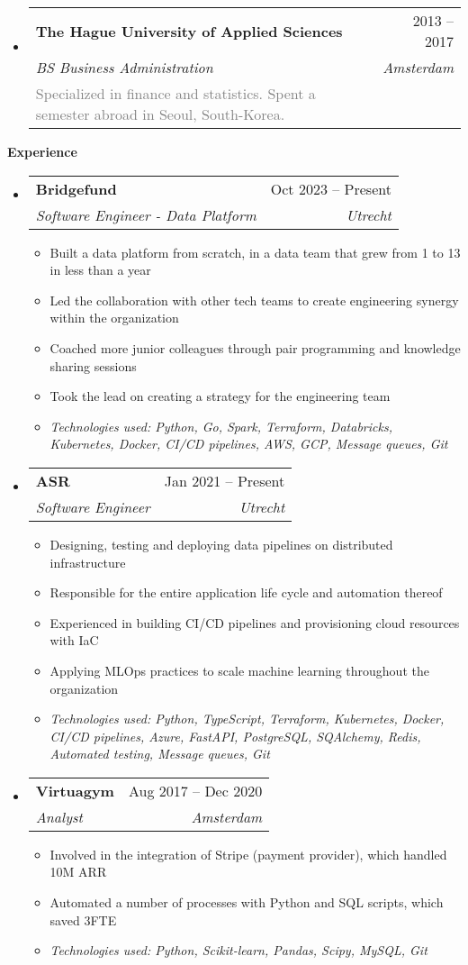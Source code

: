 \documentclass[letterpaper,12pt]{article}[leftmargin=*]
\makeatletter
\def \entryspacing {-0pt}
\renewcommand{\section}[2]{\vspace{5pt}
  \colorbox{secondary}{\color{white}\raggedbottom\normalsize\textbf{{#1}{\hspace{7pt}#2}}}
}
\newcommand{\resumeEntryStart}{\begin{itemize}[leftmargin=2.5mm]}
\newcommand{\resumeEntryEnd}{\end{itemize}\vspace{\entryspacing}}
\newcommand{\resumeItemListStart}{\begin{itemize}[leftmargin=4.5mm]}
\newcommand{\resumeItemListEnd}{\end{itemize}}
\newcommand{\resumeItem}[1]{
  \item\small{
    {#1 \vspace{-2pt}}
  }
}
\newcommand{\resumeEntryExtraText}[5]{
  \vspace{-1pt}\item[]
    \begin{tabularx}{0.97\textwidth}{X@{\hspace{60pt}}r}
      \textbf{\color{primary}#1} & {\firabook\color{accent}\small#2} \\
      \textit{\color{accent}\small#3} & \textit{\color{accent}\small#4} \\
      \textcolor{gray}{\small#5} & %
    \end{tabularx}\vspace{-6pt}
}
\newcommand{\resumeEntryTSDL}[4]{
  \vspace{-1pt}\item[]
    \begin{tabularx}{0.97\textwidth}{X@{\hspace{60pt}}r}
      \textbf{\color{primary}#1} & {\firabook\color{accent}\small#2} \\
      \textit{\color{accent}\small#3} & \textit{\color{accent}\small#4} \\
    \end{tabularx}\vspace{-6pt}
}
\makeatother
\begin{document}
  \resumeEntryStart
    \resumeEntryExtraText
      {The Hague University of Applied Sciences}{2013 -- 2017}
      {BS Business Administration}{Amsterdam}
      {Specialized in finance and statistics. Spent a semester abroad in Seoul, South-Korea.}
  \resumeEntryEnd

\section{\faPieChart}{Experience}

  \resumeEntryStart
    \resumeEntryTSDL
      {Bridgefund}{Oct 2023 -- Present}
      {Software Engineer - Data Platform}{Utrecht}
    \resumeItemListStart
      \resumeItem {Built a data platform from scratch, in a data team that grew from 1 to 13 in less than a year}
      \resumeItem {Led the collaboration with other tech teams to create engineering synergy within the organization}
      \resumeItem {Coached more junior colleagues through pair programming and knowledge sharing sessions}
      \resumeItem {Took the lead on creating a strategy for the engineering team}
      \resumeItem {\textit{Technologies used: Python, Go, Spark, Terraform, Databricks, Kubernetes, Docker, CI/CD pipelines, AWS, GCP, Message queues, Git}}
    \resumeItemListEnd
  \resumeEntryEnd

  \resumeEntryStart
    \resumeEntryTSDL
      {ASR}{Jan 2021 -- Present}
      {Software Engineer}{Utrecht}
    \resumeItemListStart
      \resumeItem {Designing, testing and deploying data pipelines on distributed infrastructure}
      \resumeItem {Responsible for the entire application life cycle and automation thereof}
      \resumeItem {Experienced in building CI/CD pipelines and provisioning cloud resources with IaC}
      \resumeItem {Applying MLOps practices to scale machine learning throughout the organization}
      \resumeItem {\textit{Technologies used: Python, TypeScript, Terraform, Kubernetes, Docker, CI/CD pipelines, Azure, FastAPI, PostgreSQL, SQAlchemy, Redis, Automated testing, Message queues, Git}}
    \resumeItemListEnd
  \resumeEntryEnd
  
  \resumeEntryStart
    \resumeEntryTSDL
      {Virtuagym}{Aug 2017 -- Dec 2020}
      {Analyst}{Amsterdam}
    \resumeItemListStart
        \resumeItem {Involved in the integration of Stripe (payment provider), which handled 10M ARR }
        \resumeItem {Automated a number of processes with Python and SQL scripts, which saved 3FTE}
        \resumeItem {\textit{Technologies used: Python, Scikit-learn, Pandas, Scipy, MySQL, Git}}
    \resumeItemListEnd
  \resumeEntryEnd
\end{document}
